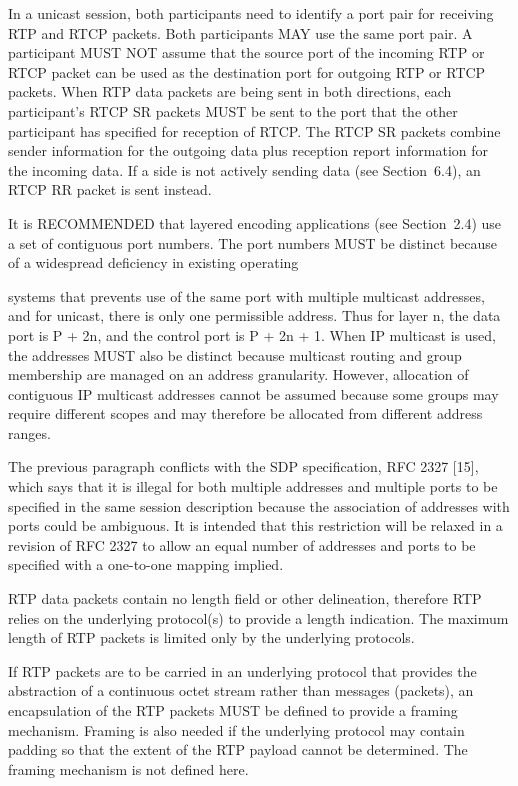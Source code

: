 \documentclass{article}
\begin{document}
In a unicast session, both participants need to identify a port pair for receiving RTP and RTCP packets.  Both participants MAY use the same port pair.  A participant MUST NOT assume that the source port of the incoming RTP or RTCP packet can be used as the destination port for outgoing RTP or RTCP packets.  When RTP data packets are being sent in both directions, each participant's RTCP SR packets MUST be sent to the port that the other participant has specified for reception of RTCP.  The RTCP SR packets combine sender information for the outgoing data plus reception report information for the incoming data.  If a side is not actively sending data (see Section~6.4), an RTCP RR packet is sent instead.

It is RECOMMENDED that layered encoding applications (see Section~2.4) use a set of contiguous port numbers.  The port numbers MUST be distinct because of a widespread deficiency in existing operating

systems that prevents use of the same port with multiple multicast addresses, and for unicast, there is only one permissible address. Thus for layer n, the data port is P + 2n, and the control port is P + 2n + 1.  When IP multicast is used, the addresses MUST also be distinct because multicast routing and group membership are managed on an address granularity.  However, allocation of contiguous IP multicast addresses cannot be assumed because some groups may require different scopes and may therefore be allocated from different address ranges.

The previous paragraph conflicts with the SDP specification, RFC 2327 [15], which says that it is illegal for both multiple addresses and multiple ports to be specified in the same session description because the association of addresses with ports could be ambiguous. It is intended that this restriction will be relaxed in a revision of RFC 2327 to allow an equal number of addresses and ports to be specified with a one-to-one mapping implied.

RTP data packets contain no length field or other delineation, therefore RTP relies on the underlying protocol(s) to provide a length indication.  The maximum length of RTP packets is limited only by the underlying protocols.

If RTP packets are to be carried in an underlying protocol that provides the abstraction of a continuous octet stream rather than messages (packets), an encapsulation of the RTP packets MUST be defined to provide a framing mechanism.  Framing is also needed if the underlying protocol may contain padding so that the extent of the RTP payload cannot be determined.  The framing mechanism is not defined here.
\end{document}
